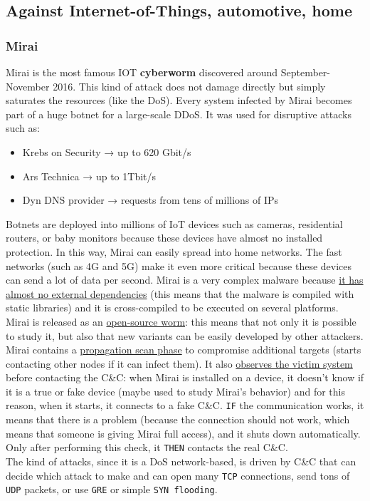 \subsection{Against Internet-of-Things, automotive, home}

\subsubsection{Mirai}
Mirai is the most famous IOT \textbf{cyberworm} discovered around September-November 2016. This kind of attack does not damage directly but simply saturates the resources (like the DoS). Every system infected by Mirai becomes part of a huge botnet for a large-scale DDoS. It was used for disruptive attacks such as:
\begin{itemize}
	\item Krebs on Security → up to 620 Gbit/s
	\item Ars Technica → up to 1Tbit/s
	\item Dyn DNS provider → requests from tens of millions of IPs
\end{itemize}

Botnets are deployed into millions of IoT devices such as cameras, residential routers, or baby monitors because these devices have almost no installed protection. In this way, Mirai can easily spread into home networks. The fast networks (such as 4G and 5G) make it even more critical because these devices can send a lot of data per second.
Mirai is a very complex malware because \ul{it has almost no external dependencies} (this means that the malware is compiled with static libraries) and it is cross-compiled to be executed on several platforms. Mirai is released as an \ul{open-source worm}: this means that not only it is possible to study it, but also that new variants can be easily developed by other attackers.
Mirai contains a \ul{propagation scan phase} to compromise additional targets (starts contacting other nodes if it can infect them).
It also \ul{observes the victim system} before contacting the C\&C: when Mirai is installed on a device, it doesn't know if it is a true or fake device (maybe used to study Mirai's behavior) and for this reason, when it starts, it connects to a fake C\&C. \texttt{IF} the communication works, it means that there is a problem (because the connection should not work, which means that someone is giving Mirai full access), and it shuts down automatically. Only after performing this check, it \texttt{THEN} contacts the real C\&C.\\
The kind of attacks, since it is a DoS network-based, is driven by C\&C that can decide which attack to make and can open many \texttt{TCP} connections, send tons of \texttt{UDP} packets, or use \texttt{GRE} or simple \texttt{SYN flooding}.

